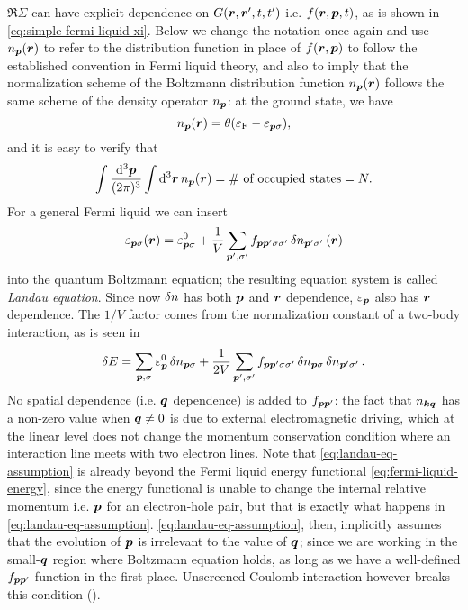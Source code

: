 \documentclass[hyperref, a4paper]{article}
\newcommand*{\term}[1]{\textit{#1}}
\newcommand*{\efermi}{\varepsilon_{\text{F}}}
\begin{document}
$\Re \Sigma$ can have explicit dependence on $G(\vb*{r}, \vb*{r}', t, t')$
i.e. $f(\vb*{r}, \vb*{p}, t)$,
as is shown in \eqref{eq:simple-fermi-liquid-xi}.
Below we change the notation once again and use $n_{\vb*{p}}(\vb*{r})$ 
to refer to the distribution function in place of $f(\vb*{r}, \vb*{p})$
to follow the established convention in Fermi liquid theory,
and also to imply that 
the normalization scheme of the Boltzmann distribution function $n_{\vb*{p}}(\vb*{r})$
follows the same scheme of the density operator $n_{\vb*{p}}$:
at the ground state, we have 
\begin{equation}
    n_{\vb*{p}}(\vb*{r}) = \theta(\efermi - \varepsilon_{\vb*{p} \sigma}),
\end{equation}
and it is easy to verify that 
\begin{equation}
    \int \frac{\dd[3]{\vb*{p}}}{(2\pi)^3} \int \dd[3]{\vb*{r}} n_{\vb*{p}}(\vb*{r})  = 
    \text{\# of occupied states} = N.
\end{equation}
For a general Fermi liquid we can insert
\begin{equation}
    \varepsilon_{\vb*{p} \sigma}(\vb*{r}) = \varepsilon^0_{\vb*{p} \sigma} + 
    \frac{1}{V} \sum_{\vb*{p}', \sigma'} f_{\vb*{p} \vb*{p}' \sigma \sigma'} \var{n}_{\vb*{p}' \sigma'} (\vb*{r})
    \label{eq:landau-eq-assumption}
\end{equation}
into the quantum Boltzmann equation;
the resulting equation system is called \term{Landau equation}.
Since now $\var{n}$ has both $\vb*{p}$ and $\vb*{r}$ dependence,
$\varepsilon_{\vb*{p}}$ also has $\vb*{r}$ dependence.
The $1/V$ factor comes from the normalization constant 
of a two-body interaction, 
as is seen in 
\begin{equation}
    \var{E} = \sum_{\vb*{p}, \sigma} \varepsilon^0_{\vb*{p}} \var{n}_{\vb*{p} \sigma}
    + \frac{1}{2V} \sum_{\vb*{p}', \sigma'} f_{\vb*{p} \vb*{p}' \sigma \sigma'}
    \var{n}_{\vb*{p} \sigma} \var{n}_{\vb*{p}' \sigma'}.
    \label{eq:fermi-liquid-energy}
\end{equation}
No spatial dependence (i.e. $\vb*{q}$ dependence) 
is added to $f_{\vb*{p} \vb*{p}'}$:
the fact that $n_{\vb*{k} \vb*{q}}$ has a non-zero value when $\vb*{q} \neq 0$
is due to external electromagnetic driving, 
which at the linear level does not change
the momentum conservation condition 
where an interaction line meets with two electron lines.
Note that \eqref{eq:landau-eq-assumption} is already beyond 
the Fermi liquid energy functional \eqref{eq:fermi-liquid-energy},
since the energy functional is unable to change the internal relative momentum
i.e. $\vb*{p}$ for an electron-hole pair,
but that is exactly what happens in \eqref{eq:landau-eq-assumption}.
\eqref{eq:landau-eq-assumption}, then, implicitly assumes 
that the evolution of $\vb*{p}$ is irrelevant to the value of $\vb*{q}$;
since we are working in the small-$\vb*{q}$ region where Boltzmann equation holds,
as long as we have a well-defined $f_{\vb*{p} \vb*{p}'}$ function 
in the first place.
Unscreened Coulomb interaction however breaks this condition
().
\end{document}
